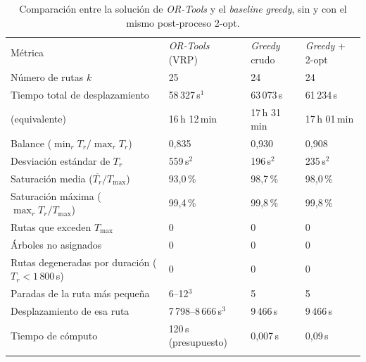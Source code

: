 \begin{table}[H]
  \centering
  \begin{threeparttable}[b]
  \caption{
    Comparación entre la solución de \textit{OR-Tools} y el \textit{baseline} \textit{greedy}, sin y
    con el mismo post-proceso 2-opt.
  }
  \label{tab:comparativa}
  \begin{tabularx}{\textwidth}{Xlll}
    \toprule
    Métrica &
      \textit{OR-Tools} (VRP) &
      \textit{Greedy} crudo &
      \textit{Greedy} + 2-opt \\
      \addlinespace
    \midrule
    Número de rutas $k$ &
      25 &
      24 &
      24 \\
      \addlinespace
    Tiempo total de desplazamiento &
      58\,327\,s$^{1}$ &
      63\,073\,s &
      61\,234\,s \\
      \addlinespace
    \phantom{Tiempo total} (equivalente) &
      16\,h 12\,min &
      17\,h 31\,min &
      17\,h 01\,min \\
      \addlinespace
    Balance ($\min_r T_r / \max_r T_r$) &
      0,835 &
      0,930 &
      0,908 \\
      \addlinespace
    Desviación estándar de $T_r$ &
      559\,s$^{2}$ &
      196\,s$^{2}$ &
      235\,s$^{2}$ \\
      \addlinespace
    Saturación media ($\overline{T_r}/T_{\max}$) &
      93,0\,\% &
      98,7\,\% &
      98,0\,\% \\
      \addlinespace
    Saturación máxima ($\max_r T_r/T_{\max}$) &
      99,4\,\% &
      99,8\,\% &
      99,8\,\% \\
      \addlinespace
    Rutas que exceden $T_{\max}$ &
      0 &
      0 &
      0 \\
      \addlinespace
    Árboles no asignados &
      0 &
      0 &
      0 \\
      \addlinespace
    Rutas degeneradas por duración ($T_r < 1\,800$\,s) &
      0 &
      0 &
      0 \\
      \addlinespace
    Paradas de la ruta más pequeña &
      6--12$^{3}$ &
      5 &
      5 \\
      \addlinespace
    Desplazamiento de esa ruta &
      7\,798--8\,666\,s$^{3}$ &
      9\,466\,s &
      9\,466\,s \\
      \addlinespace
    Tiempo de cómputo &
      120\,s (presupuesto) &
      0,007\,s &
      0,09\,s \\
      \addlinespace
    \bottomrule
  \end{tabularx}
  \begin{tablenotes}[flushleft]\footnotesize

\end{tablenotes}
\end{threeparttable}
\end{table}
